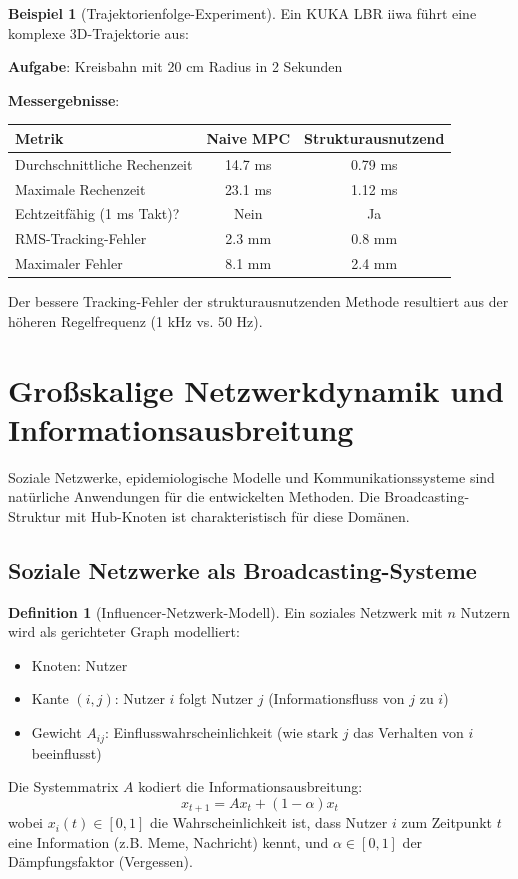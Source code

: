 \documentclass[a4paper,12pt]{report}
\theoremstyle{definition}
\newtheorem{definition}{Definition}
\newtheorem{beispiel}{Beispiel}
\begin{document}
	\begin{beispiel}[Trajektorienfolge-Experiment]
		Ein KUKA LBR iiwa führt eine komplexe 3D-Trajektorie aus:
		
		\textbf{Aufgabe}: Kreisbahn mit 20 cm Radius in 2 Sekunden
		
		\textbf{Messergebnisse}:
		\begin{center}
			\begin{tabular}{|l|c|c|}
				\hline
				\textbf{Metrik} & \textbf{Naive MPC} & \textbf{Strukturausnutzend} \\
				\hline
				Durchschnittliche Rechenzeit & 14.7 ms & 0.79 ms \\
				Maximale Rechenzeit & 23.1 ms & 1.12 ms \\
				Echtzeitfähig (1 ms Takt)? & Nein & Ja \\
				RMS-Tracking-Fehler & 2.3 mm & 0.8 mm \\
				Maximaler Fehler & 8.1 mm & 2.4 mm \\
				\hline
			\end{tabular}
		\end{center}
		
		Der bessere Tracking-Fehler der strukturausnutzenden Methode resultiert aus der höheren Regelfrequenz (1 kHz vs. 50 Hz).
	\end{beispiel}
	
	\section{Großskalige Netzwerkdynamik und Informationsausbreitung}
	
	Soziale Netzwerke, epidemiologische Modelle und Kommunikationssysteme sind natürliche Anwendungen für die entwickelten Methoden. Die Broadcasting-Struktur mit Hub-Knoten ist charakteristisch für diese Domänen.
	
	\subsection{Soziale Netzwerke als Broadcasting-Systeme}
	
	\begin{definition}[Influencer-Netzwerk-Modell]
		Ein soziales Netzwerk mit $n$ Nutzern wird als gerichteter Graph modelliert:
		\begin{itemize}
			\item Knoten: Nutzer
			\item Kante $(i,j)$: Nutzer $i$ folgt Nutzer $j$ (Informationsfluss von $j$ zu $i$)
			\item Gewicht $A_{ij}$: Einflusswahrscheinlichkeit (wie stark $j$ das Verhalten von $i$ beeinflusst)
		\end{itemize}
		
		Die Systemmatrix $A$ kodiert die Informationsausbreitung:
		\[
		x_{t+1} = A x_t + (1-\alpha) x_t
		\]
		wobei $x_i(t) \in [0,1]$ die Wahrscheinlichkeit ist, dass Nutzer $i$ zum Zeitpunkt $t$ eine Information (z.B. Meme, Nachricht) kennt, und $\alpha \in [0,1]$ der Dämpfungsfaktor (Vergessen).
	\end{definition}
	
\end{document}
